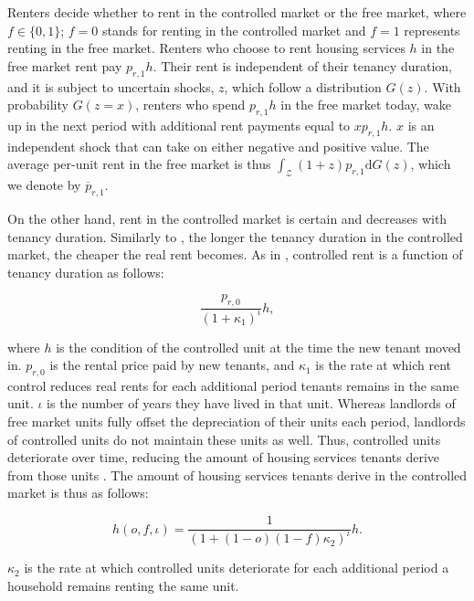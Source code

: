 \documentclass[parskip=full]{article}
\begin{document}
Renters decide whether to rent in the controlled market or the free market, where $f \in \{0,1\}$; $f=0$ stands for renting in the controlled market and $f=1$ represents renting in the free market. Renters who choose to rent housing services $h$ in the free market rent pay $p_{r,1}h$. Their rent is independent of their tenancy duration, and it is subject to uncertain shocks, $z$, which follow a distribution $G(z)$. With probability $G(z=x)$, renters who spend $p_{r,1}h$ in the free market today, wake up in the next period with additional rent payments equal to $x p_{r,1}h$. $x$ is an independent shock that can take on either negative and positive value. The average per-unit rent in the free market is thus $\int_\mathcal{Z}(1+z)p_{r,1}\mathrm{d}G(z)$, which we denote by $\overline{p}_{r,1}$. 

On the other hand, rent in the controlled market is certain and decreases with tenancy duration. Similarly to \citet{fmn-2022}, the longer the tenancy duration in the controlled market, the cheaper the real rent becomes. As in \citet{fmn-2022}, controlled rent is a function of tenancy duration as follows:

\begin{equation}\label{eq:rent_in_controlled_market}
\frac{p_{r,0}}{(1+\kappa_{1})^{\iota}} h,
\end{equation} 

\noindent where $h$ is the condition of the controlled unit at the time the new tenant moved in. $p_{r,0}$ is the rental price paid by new tenants, and $\kappa_{1}$ is the rate at which rent control reduces real rents for each additional period tenants remains in the same unit. $\iota$ is the number of years they have lived in that unit. Whereas landlords of free market units fully offset the depreciation of their units each period, landlords of controlled units do not maintain these units as well. Thus, controlled units deteriorate over time, reducing the amount of housing services tenants derive from those units \citep{gl-1990,la-2018}. The amount of housing services tenants derive in the controlled market is thus as follows:

\begin{equation}
    h(o,f,\iota)=\frac{1}{(1+(1-o)(1-f)\kappa_{2})^{\iota}} h.
\end{equation}
 
\noindent $\kappa_{2}$ is the rate at which controlled units deteriorate for each additional period a household remains renting the same unit. 
\end{document}
